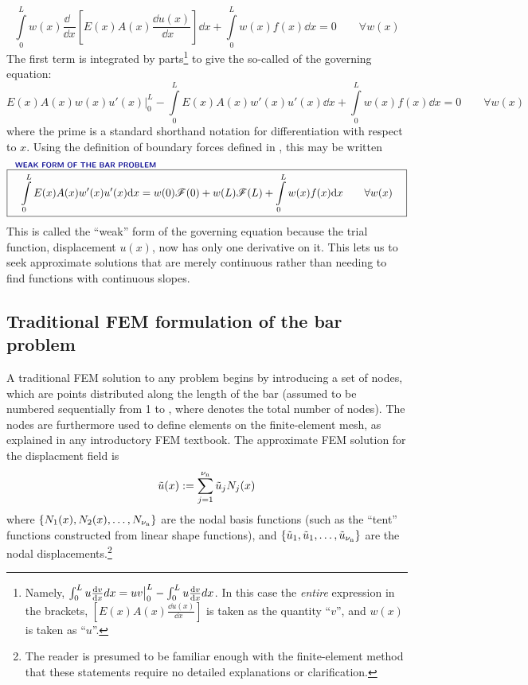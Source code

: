 \begin{equation}
  \int\limits_0^L w(x) \frac{\dd~~}{\dd x}\left[E(x)A(x) \frac{\dd u(x)}{\dd x~~~}\right]\dd x  +  \int\limits_0^L w(x)f(x)\dd x=0
\qquad\forall w(x)
\end{equation}
The first term is integrated by parts\footnote{Namely, $\int_0^L u \frac{\mathrm{d} {v}}{\mathrm{d} {x}} dx = uv \big|_0^L-\int_0^L u \frac{\mathrm{d} {v}}{\mathrm{d} {x}} dx$. In this case the \emph{entire} expression in the brackets, $\left[E(x)A(x) \frac{\dd u(x)}{\dd x~~~}\right]$ is taken as the quantity ``$v$'', and $w(x)$ is taken as ``$u$''.}  to give the so-called  of the governing equation:
\begin{equation}
  E(x)A(x) w(x)u'(x)\big|_0^L-\int\limits_0^L E(x)A(x) w'(x)u'(x)\dd x  +  \int\limits_0^L w(x)f(x)\dd x=0
\qquad\forall w(x)
\label{eq:LinearBarWeakForm}
\end{equation}
where the prime is a standard shorthand notation for differentiation with respect to $x$. Using the definition of boundary forces defined in , this may be written
\begin{equation}
\overset{\text{\Defn{WEAK FORM OF THE BAR PROBLEM}\hspace{8cm}}}{\boxit{\quad
 \int\limits_0^L E(x)A(x) w'(x)u'(x)\dd x = w(0)\tractionForce(0)+w(L)\tractionForce(L)  +  \int\limits_0^L w(x)f(x)\dd x
\qquad\forall w(x)
\quad}}
\label{eq:LinearBarWeakFormWithForcesc}
\end{equation}
This is called the ``weak'' form of the governing equation because the trial function, displacement $u(x)$, now has only one derivative on it. This lets us to seek approximate solutions that are merely continuous rather than needing to find functions with continuous slopes.



\subsection{Traditional FEM formulation of the bar problem}
\label{sec:LinearBarFEM}
A traditional FEM solution to any \oneD problem begins by introducing a set of nodes, which are points distributed along the length of the bar (assumed to be numbered sequentially from 1 to \numnodes, where \numnodes denotes the total number of nodes).  The nodes are furthermore used to define elements on the finite-element mesh, as explained in any introductory FEM textbook.   
The approximate FEM solution for the displacment field is
\begin{equation}
  \tilde{u}(x):=\sum\limits_{j=1}^{{\nu_\text{n}}}\tilde{u}_j {N}_j(x)
\label{eq:aprxuc}
\end{equation}
where $\{{N}_1(x),{N}_2(x),\ldots,{N}_{\nu_\text{n}}\}$ are the nodal basis functions (such as the ``tent'' functions constructed from linear shape functions), and $\{\tilde{u}_1, \tilde{u}_1, \ldots, \tilde{u}_{\nu_\text{n}}\}$  
are the nodal displacements.\footnote{The reader is presumed to be familiar enough with the finite-element method that these statements require no detailed explanations or clarification.}

